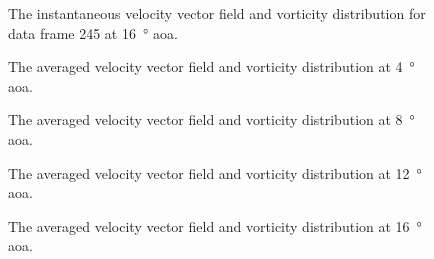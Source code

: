 \begin{figure}[htpb]
    \centering
    
    \caption{The instantaneous velocity vector field and vorticity distribution for data frame \num{245} at \qty{16}{\degree} \acrshort{aoa}.}
    \label{fig:instant_aoa16}
\end{figure}

\begin{figure}[htpb]
    \centering
    
    \caption{The averaged velocity vector field and vorticity distribution at \qty{4}{\degree} \acrshort{aoa}.}
    \label{fig:averaged_piv_aoa4}
\end{figure}

\begin{figure}[htpb]
    \centering
    
    \caption{The averaged velocity vector field and vorticity distribution at \qty{8}{\degree} \acrshort{aoa}.}
    \label{fig:averaged_piv_aoa8}
\end{figure}

\begin{figure}[htpb]
    \centering
    
    \caption{The averaged velocity vector field and vorticity distribution at \qty{12}{\degree} \acrshort{aoa}.}
    \label{fig:averaged_piv_aoa12}
\end{figure}

\begin{figure}[htpb]
    \centering
    
    \caption{The averaged velocity vector field and vorticity distribution at \qty{16}{\degree} \acrshort{aoa}.}
    \label{fig:averaged_piv_aoa16}
\end{figure}

%     
